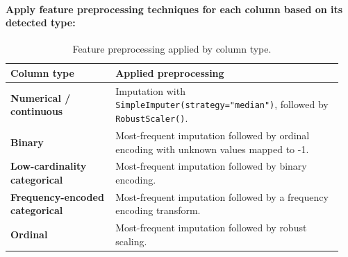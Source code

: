 \paragraph{Apply feature preprocessing techniques for each column based on its detected type:}\par

\begin{table}[!htbp]
\centering
\caption{Feature preprocessing applied by column type.}
\begin{tabular}{p{0.30\linewidth}p{0.65\linewidth}}
\toprule
\textbf{Column type} & \textbf{Applied preprocessing}\\
\midrule
\textbf{Numerical / continuous} & Imputation with \texttt{SimpleImputer(strategy="median")}, followed by \texttt{RobustScaler()}.\\
\textbf{Binary} & Most-frequent imputation followed by ordinal encoding with unknown values mapped to -1.\\
\textbf{Low-cardinality categorical} & Most-frequent imputation followed by binary encoding.\\
\textbf{Frequency-encoded categorical} & Most-frequent imputation followed by a frequency encoding transform.\\
\textbf{Ordinal} & Most-frequent imputation followed by robust scaling.\\
\bottomrule
\end{tabular}
\end{table}
